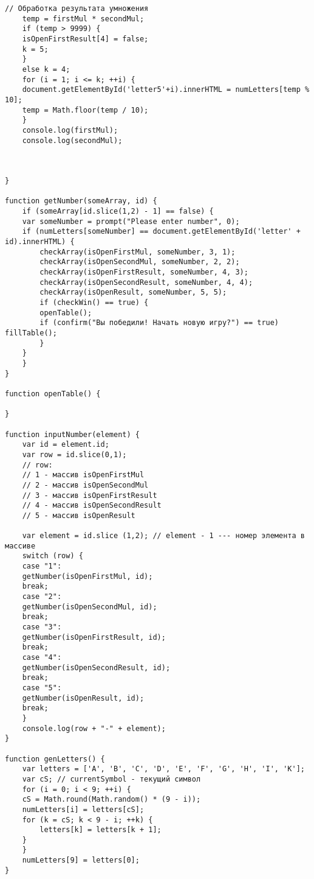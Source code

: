\begin{lstlisting}[caption=myScript.js]
    // Обработка результата умножения
    temp = firstMul * secondMul;
    if (temp > 9999) {
	isOpenFirstResult[4] = false;
	k = 5;
    }
    else k = 4;
    for (i = 1; i <= k; ++i) {
	document.getElementById('letter5'+i).innerHTML = numLetters[temp % 10];
	temp = Math.floor(temp / 10);
    }
    console.log(firstMul);
    console.log(secondMul);
    
    
    
}

function getNumber(someArray, id) {
    if (someArray[id.slice(1,2) - 1] == false) {
	var someNumber = prompt("Please enter number", 0);
	if (numLetters[someNumber] == document.getElementById('letter' + id).innerHTML) {
	    checkArray(isOpenFirstMul, someNumber, 3, 1);
	    checkArray(isOpenSecondMul, someNumber, 2, 2);
	    checkArray(isOpenFirstResult, someNumber, 4, 3);
	    checkArray(isOpenSecondResult, someNumber, 4, 4);
	    checkArray(isOpenResult, someNumber, 5, 5);
	    if (checkWin() == true) {
		openTable();
		if (confirm("Вы победили! Начать новую игру?") == true) fillTable();
	    }
	}
    }
}

function openTable() {
    
}

function inputNumber(element) {
    var id = element.id;
    var row = id.slice(0,1);
    // row:
    // 1 - массив isOpenFirstMul
    // 2 - массив isOpenSecondMul
    // 3 - массив isOpenFirstResult
    // 4 - массив isOpenSecondResult
    // 5 - массив isOpenResult
    
    var element = id.slice (1,2); // element - 1 --- номер элемента в массиве
    switch (row) {
    case "1":
	getNumber(isOpenFirstMul, id);
	break;
    case "2":
	getNumber(isOpenSecondMul, id);
	break;
    case "3":
	getNumber(isOpenFirstResult, id);
	break;
    case "4":
	getNumber(isOpenSecondResult, id);
	break;
    case "5":
	getNumber(isOpenResult, id);
	break;
    }
    console.log(row + "-" + element);
}

function genLetters() {
    var letters = ['A', 'B', 'C', 'D', 'E', 'F', 'G', 'H', 'I', 'K'];
    var cS; // currentSymbol - текущий символ
    for (i = 0; i < 9; ++i) {
	cS = Math.round(Math.random() * (9 - i));
	numLetters[i] = letters[cS];
	for (k = cS; k < 9 - i; ++k) {
	    letters[k] = letters[k + 1];
	}
    }
    numLetters[9] = letters[0];
}
\end{lstlisting}
